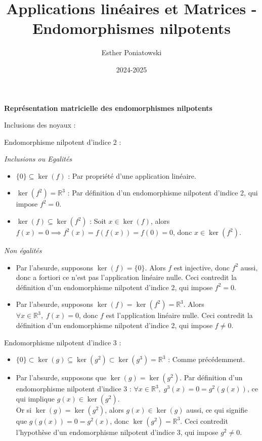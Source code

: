 \documentclass[10pt,a4paper]{article}
\title{Applications linéaires et Matrices - Endomorphismes nilpotents}
\author{Esther Poniatowski}
\date{2024-2025}
\begin{document}
\textbf{Représentation matricielle des endomorphismes nilpotents}

\q Inclusions des noyaux :

Endomorphisme nilpotent d'indice 2 :

\emph{Inclusions ou Egalités}
\begin{itemize}
    \item \(\{0\} \subseteq \ker(f)\) : Par propriété d'une application linéaire.
    \item \(\ker(f^2) = \mathbb{R}^3\) : Par définition d'un endomorphisme nilpotent d'indice 2, qui
    impose \(f^2 = 0\).
    \item \(\ker(f) \subseteq \ker(f^2)\) : Soit \(x \in \ker(f)\), alors \(f(x) = 0 \implies f^2(x)
    = f(f(x)) = f(0) = 0\), donc \(x \in \ker(f^2)\).\\
\end{itemize}

\emph{Non égalités}
\begin{itemize}
    \item Par l'absurde, supposons \(\ker(f) = \{0\}\). Alors \(f\) est injective, donc \(f^2\)
    aussi, donc a fortiori ce n'est pas l'application linéaire nulle. Ceci contredit la définition
    d'un endomorphisme nilpotent d'indice 2, qui impose \(f^2 = 0\).
    \item Par l'absurde, supposons \(\ker(f) = \ker(f^2) = \mathbb{R}^3\). Alors \(\forall x \in
    \mathbb{R}^3, \; f(x) = 0\), donc \(f\) est l'application linéaire nulle. Ceci contredit la
    définition d'un endomorphisme nilpotent d'indice 2, qui impose \(f \neq 0\).\\
\end{itemize}

Endomorphisme nilpotent d'indice 3 :

 \begin{itemize}
    \item \(\{0\} \subset \ker(g) \subseteq \ker(g^2) \subset \ker(g^3) = \mathbb{R}^3\) : Comme
    précédemment.
    \item Par l'absurde, supposons que \(\ker(g) = \ker(g^2)\). Par définition d'un endomorphisme
    nilpotent d'indice 3 : \(\forall x\in\mathbb{R}^3, \; g^3(x) = 0 = g^2(g(x))\), ce qui implique
    \(g(x) \in \ker(g^2)\). \\
    Or si \(\ker(g) = \ker(g^2)\), alors \(g(x) \in \ker(g)\) aussi, ce qui signifie que \(g(g(x)) =
    0 = g^2(x)\), donc \(\ker(g^2) = \mathbb{R}^3\). Ceci contredit l'hypothèse d'un endomorphisme
    nilpotent d'indice 3, qui impose \(g^2 \neq 0\).\\
\end{itemize}
\end{document}
